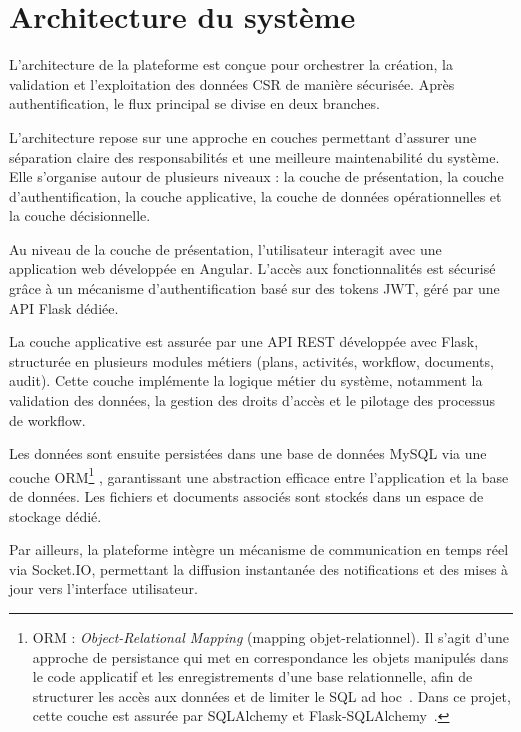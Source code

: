 \section{Architecture du système}

L’architecture de la plateforme est conçue pour orchestrer la création, la validation et l’exploitation des données CSR de manière sécurisée. Après authentification, le flux principal se divise en deux branches.
\par\addvspace{2ex}%

L’architecture repose sur une approche en couches permettant d’assurer une séparation claire des responsabilités et une meilleure maintenabilité du système. Elle s’organise autour de plusieurs niveaux : la couche de présentation, la couche d’authentification, la couche applicative, la couche de données opérationnelles et la couche décisionnelle.
\par\addvspace{2ex}%
Au niveau de la couche de présentation, l’utilisateur interagit avec une application web développée en Angular. L’accès aux fonctionnalités est sécurisé grâce à un mécanisme d’authentification basé sur des tokens JWT, géré par une API Flask dédiée.
\par\addvspace{2ex}%
La couche applicative est assurée par une API REST développée avec Flask, structurée en plusieurs modules métiers (plans, activités, workflow, documents, audit). Cette couche implémente la logique métier du système, notamment la validation des données, la gestion des droits d’accès et le pilotage des processus de workflow.
\par\addvspace{2ex}%
Les données sont ensuite persistées dans une base de données MySQL via une couche ORM\footnote{ORM : \emph{Object-Relational Mapping} (mapping objet-relationnel). Il s’agit d’une approche de persistance qui met en correspondance les objets manipulés dans le code applicatif et les enregistrements d’une base relationnelle, afin de structurer les accès aux données et de limiter le SQL ad hoc~\cite{orm-wikipedia}. Dans ce projet, cette couche est assurée par SQLAlchemy et Flask-SQLAlchemy~\cite{sqlalchemy-docs}.}
, garantissant une abstraction efficace entre l’application et la base de données. Les fichiers et documents associés sont stockés dans un espace de stockage dédié.
\par\addvspace{2ex}%
Par ailleurs, la plateforme intègre un mécanisme de communication en temps réel via Socket.IO, permettant la diffusion instantanée des notifications et des mises à jour vers l’interface utilisateur.
\par\addvspace{2ex}%

